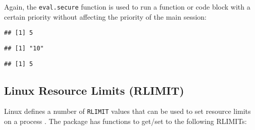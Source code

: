 Again, the \texttt{eval.secure} function is used to run a function or code block
with a certain priority without affecting the priority of the main \R session:

\begin{knitrout}\mycodesize
{}\color{fgcolor}\begin{kframe}
\begin{alltt}
\hlstd{()}
\end{alltt}
\begin{verbatim}
## [1] 5
\end{verbatim}
\begin{alltt}
\hlstd{(}\hlstd{(}\hlstd{,}  \hlstd{=} \hlstd{),}  \hlstd{=} \hlstd{)}
\end{alltt}
\begin{verbatim}
## [1] "10"
\end{verbatim}
\begin{alltt}
\hlstd{()}
\end{alltt}
\begin{verbatim}
## [1] 5
\end{verbatim}
\end{kframe}
\end{knitrout}


\subsection{Linux Resource Limits (RLIMIT)}
\label{RLIMITS}

Linux defines a number of \texttt{RLIMIT} values that can be used to set
resource limits on a process \citep{linuxrlimit}. The \RAppArmor package
has functions to get/set to the following RLIMITs:

